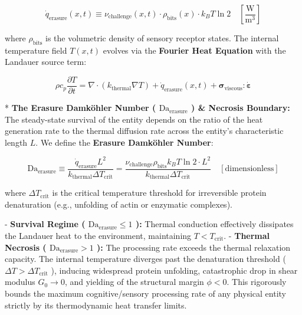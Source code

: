 \documentclass[11pt,a4paper]{article}
\theoremstyle{definition}
\theoremstyle{remark}
\begin{document}
\begin{equation}
\dot{q}_{\text{erasure}}(x, t) \equiv \nu_{\text{challenge}}(x,t) \cdot \rho_{\text{bits}}(x) \cdot k_B T \ln 2 \quad [\frac{\mathrm{W}}{\mathrm{m^3}}]
\end{equation}


where $\rho_{\text{bits}}$ is the volumetric density of sensory receptor states. The internal temperature field $T(x,t)$ evolves via the \textbf{Fourier Heat Equation} with the Landauer source term:


\begin{equation}
\boxed{\rho c_p \frac{\partial T}{\partial t} = \nabla \cdot (k_{\text{thermal}} \nabla T) + \dot{q}_{\text{erasure}}(x, t) + \boldsymbol{\sigma}_{\text{viscous}} : \dot{\boldsymbol{\varepsilon}}}
\end{equation}


* \textbf{The Erasure Damköhler Number ( $\mathrm{Da}_{\text{erasure}}$ ) \& Necrosis Boundary:}
The steady-state survival of the entity depends on the ratio of the heat generation rate to the thermal diffusion rate across the entity's characteristic length $L$. We define the \textbf{Erasure Damköhler Number}:


\begin{equation}
\boxed{\mathrm{Da}_{\text{erasure}} \equiv \frac{\dot{q}_{\text{erasure}} L^2}{k_{\text{thermal}} \Delta T_{\text{crit}}} = \frac{\nu_{\text{challenge}} \rho_{\text{bits}} k_B T \ln 2 \cdot L^2}{k_{\text{thermal}} \Delta T_{\text{crit}}} \quad [\text{dimensionless}]}
\end{equation}


where $\Delta T_{\text{crit}}$ is the critical temperature threshold for irreversible protein denaturation (e.g., unfolding of actin or enzymatic complexes).

- \textbf{Survival Regime ( $\mathrm{Da}_{\text{erasure}} \le 1$ ):} Thermal conduction effectively dissipates the Landauer heat to the environment, maintaining $T < T_{\text{crit}}$.
- \textbf{Thermal Necrosis ( $\mathrm{Da}_{\text{erasure}} > 1$ ):} The processing rate exceeds the thermal relaxation capacity. The internal temperature diverges past the denaturation threshold ( $\Delta T > \Delta T_{\text{crit}}$ ), inducing widespread protein unfolding, catastrophic drop in shear modulus $G_0 \to 0$, and yielding of the structural margin $\phi < 0$. This rigorously bounds the maximum cognitive/sensory processing rate of any physical entity strictly by its thermodynamic heat transfer limits.
\end{document}
